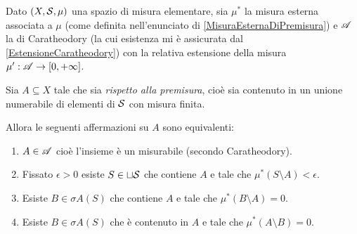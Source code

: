 \begin{proposition}\label{thm:EquivalenzeMisurabilitaSottoinsieme}
	Dato $(X,\S,\mu)$ una spazio di misura elementare, sia $\mu^*$ la misura esterna associata a $\mu$ (come definita nell'enunciato di \cref{MisuraEsternaDiPremisura}) e $\A$ la \sigalg{} di Caratheodory (la cui esistenza mi è assicurata dal \cref{EstensioneCaratheodory}) con la relativa estensione della misura $\mu':\A\to\Rpiu$.
	
	Sia $A\subseteq X$ tale che sia \emph{\sigfin[o] rispetto alla premisura}, cioè sia contenuto in un unione numerabile di elementi di $\S$ con misura finita.
	
	Allora le seguenti affermazioni su $A$ sono equivalenti:
	\begin{enumerate}[label=(\arabic*),ref=(\arabic*)]
		\item $A\in\A$ cioè l'insieme è un misurabile (secondo Caratheodory).\label{MisurabileEquivalenze}
		\item Fissato $\epsilon>0$ esiste $S\in\sqcup\S$ che contiene $A$ e tale che $\mu^*(S\setminus A)<\epsilon$.\label{UnioniDaFuoriEquivalenze}
		\item Esiste $B\in\sigma A(S)$ che contiene $A$ e tale che $\mu^*(B\setminus A)=0$.\label{SigmaDaFuoriEquivalenze}
		\item Esiste $B\in\sigma A(S)$ che è contenuto in $A$ e tale che $\mu^*(A\setminus B)=0$.\label{SigmaDaDentroEquivalenze}
	\end{enumerate}
\end{proposition}
\newcommand{\ImplicationProof}[2]{$\text{\ref{#1}}\implies\text{\ref{#2}}$}%
